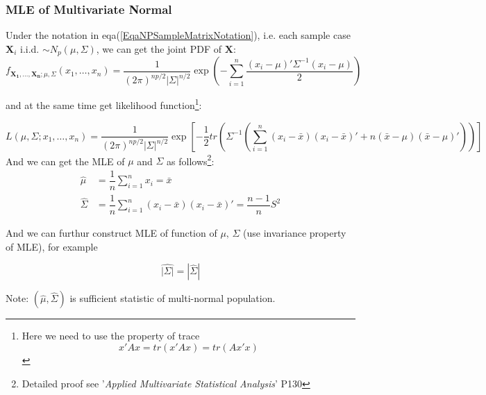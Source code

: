     
    
\subsubsection{MLE of Multivariate Normal}
    Under the notation in eqa(\ref{EqaNPSampleMatrixNotation}), i.e. each sample case $ \mathbf{X}_i$ i.i.d. $\sim N_p(\mu,\Sigma ) $, we can get the joint PDF of $ \mathbf{X} $:
    \begin{equation}
        f_{\mathbf{X_1},\ldots,\mathbf{X_n};\mu,\Sigma }(x_1,\ldots,x_n)=\dfrac{1}{(2\pi)^{np/2}|\Sigma |^{n/2}}\exp\left( -\sum_{i=1}^n\dfrac{(x_i-\mu)'\Sigma ^{-1}(x_i-\mu)}{2} \right) 
    \end{equation}
  
    and at the same time get likelihood function\footnote{Here we need to use the property of trace
    \begin{equation}
        x'Ax=tr(x'Ax)=tr(Ax'x)
    \end{equation}    }:
    
    \begin{equation}
        L(\mu ,\Sigma;x_1,\ldots,x_n)=\dfrac{1}{(2\pi)^{np/2}|\Sigma |^{n/2}}\exp\left[ -\dfrac{1}{2}tr\left( \Sigma ^{-1} \left(\sum_{i=1}^n(x_i-\bar{x})(x_i-\bar{x})'+n(\bar{x}-\mu)(\bar{x}-\mu)' \right) \right) \right]
    \end{equation}
        And we can get the MLE of $ \mu $ and $ \Sigma  $ as follows\footnote{Detailed proof see '\textit{Applied Multivariate Statistical Analysis}' P130}:
        \begin{align*}
            \hat{\mu}&= \dfrac{1}{n}\sum_{i=1}^n x_i=\bar{x} \\
            \hat{\Sigma  }&= \dfrac{1}{n}\sum_{i=1}^n(x_i-\bar{x})(x_i-\bar{x})'=\dfrac{n-1}{n}S^2
        \end{align*}

    
    And we can furthur construct MLE of function of $ \mu,\,\Sigma  $ (use invariance property of MLE), for example 
    
    \[
        \hat{|\Sigma |}=|\hat{\Sigma }| 
    \]
    
    
        Note: $ (\hat{\mu} , \hat{\Sigma} ) $ is sufficient statistic of multi-normal population.







    
